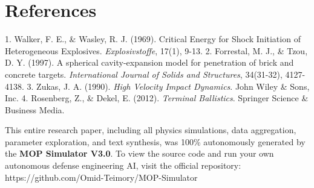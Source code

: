 \documentclass[journal,10pt,twocolumn]{IEEEtran}
\begin{document}
\section{References}
1. Walker, F. E., \& Wasley, R. J. (1969). Critical Energy for Shock Initiation of Heterogeneous Explosives. \emph{Explosivstoffe}, 17(1), 9-13.
2. Forrestal, M. J., \& Tzou, D. Y. (1997). A spherical cavity-expansion model for penetration of brick and concrete targets. \emph{International Journal of Solids and Structures}, 34(31-32), 4127-4138.
3. Zukas, J. A. (1990). \emph{High Velocity Impact Dynamics}. John Wiley \& Sons, Inc.
4. Rosenberg, Z., \& Dekel, E. (2012). \emph{Terminal Ballistics}. Springer Science \& Business Media.



This entire research paper, including all physics simulations, data aggregation, parameter exploration, and text synthesis, was 100\% autonomously generated by the \textbf{MOP Simulator V3.0}. To view the source code and run your own autonomous defense engineering AI, visit the official repository: https://github.com/Omid-Teimory/MOP-Simulator
\end{document}
